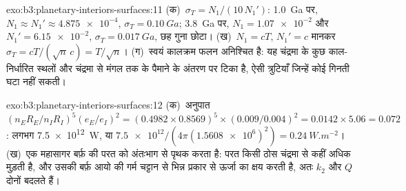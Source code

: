\begin{solution}{exo:b3:planetary-interiors-surfaces:11}
(क)~$\sigma_T = N_1/(10\,N_1')$: \qty{1.0}{Ga} पर, $N_1 \approx N_1' \approx
\num{4.875e-4}$, $\sigma_T = \qty{0.10}{Ga}$; \qty{3.8}{Ga} पर, $N_1 =
\num{1.07e-2}$ और $N_1' = \num{6.15e-2}$, $\sigma_T = \qty{0.017}{Ga}$,
छह गुना छोटा। (ख)~$N_1 = cT$, $N_1' = c$ मानकर $\sigma_T =
cT/(\sqrt n\,c) = T/\sqrt n$। (ग)~स्वयं कालक्रम फलन
अनिश्चित है: यह चंद्रमा के कुछ काल-निर्धारित स्थलों और चंद्रमा से मंगल तक के पैमाने के अंतरण पर टिका है,
ऐसी त्रुटियाँ जिन्हें कोई गिनती घटा नहीं सकती।
\end{solution}

\begin{solution}{exo:b3:planetary-interiors-surfaces:12}
(क)~अनुपात $(n_ER_E/n_IR_I)^5(e_E/e_I)^2 = (0.4982\times0.8569)^5
\times(0.009/0.004)^2 = 0.0142\times5.06 = 0.072$: लगभग
\qty{7.5e12}{W}, या $\num{7.5e12}/(4\pi(\num{1.5608e6})^2) =
\qty{0.24}{W.m^{-2}}$। (ख)~एक महासागर बर्फ़ की परत को
अंतःभाग से पृथक करता है: परत किसी ठोस चंद्रमा से कहीं अधिक मुड़ती है, और उसकी बर्फ़
आयो की गर्म चट्टान से भिन्न प्रकार से ऊर्जा का क्षय करती है, अतः $k_2$ और $Q$ दोनों बदलते हैं।
\end{solution}

